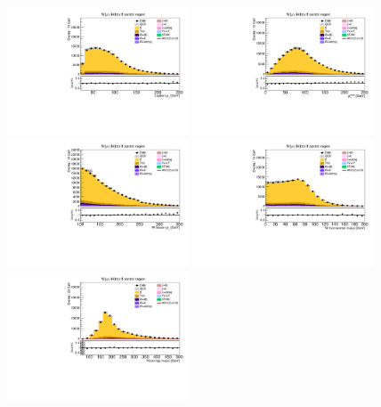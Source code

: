 \begin{figure}[tbp]
  \begin{center}
    \includegraphics[width=0.48\textwidth]{figures/wlnhbb2016/resolved/WmnWH2TopCR_lepton1Pt.pdf}
    \includegraphics[width=0.48\textwidth]{figures/wlnhbb2016/resolved/WmnWH2TopCR_pfmet.pdf}
    \includegraphics[width=0.48\textwidth]{figures/wlnhbb2016/resolved/WmnWH2TopCR_WpT.pdf}
    \includegraphics[width=0.48\textwidth]{figures/wlnhbb2016/resolved/WmnWH2TopCR_mTW.pdf}
    \includegraphics[width=0.48\textwidth]{figures/wlnhbb2016/resolved/WmnWH2TopCR_topMassLep1Met.pdf}

\end{center}
\end{figure}
